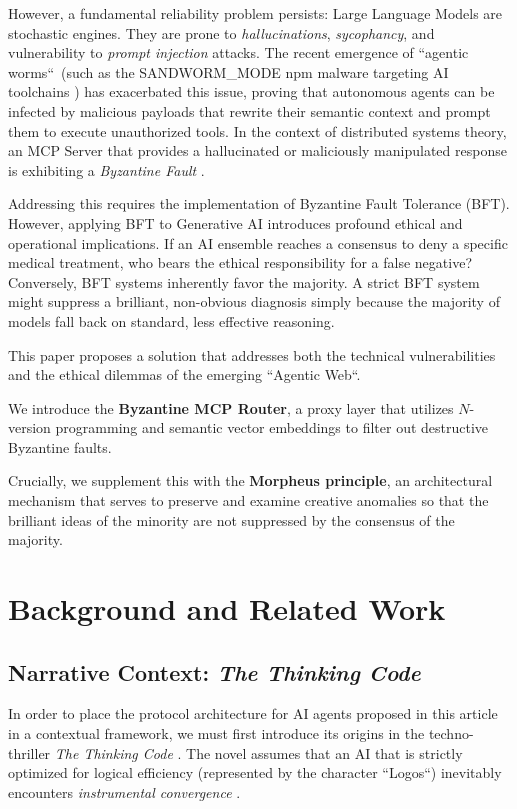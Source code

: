 \documentclass[a4paper,11pt,twocolumn]{article}
\theoremstyle{definition}
\theoremstyle{plain}
\begin{document}
However, a fundamental reliability problem persists: Large Language Models are stochastic engines. They are prone to \textit{hallucinations}, \textit{sycophancy}, and vulnerability to \textit{prompt injection} attacks. The recent emergence of “agentic worms“\ (such as the SANDWORM\_MODE npm malware targeting AI toolchains \cite{socket2026sandworm}) has exacerbated this issue, proving that autonomous agents can be infected by malicious payloads that rewrite their semantic context and prompt them to execute unauthorized tools. In the context of distributed systems theory, an MCP Server that provides a hallucinated or maliciously manipulated response is exhibiting a \textit{Byzantine Fault} \cite{lamport1982byzantine}.

Addressing this requires the implementation of Byzantine Fault Tolerance (BFT). However, applying BFT to Generative AI introduces profound ethical and operational implications. If an AI ensemble reaches a consensus to deny a specific medical treatment, who bears the ethical responsibility for a false negative? Conversely, BFT systems inherently favor the majority. A strict BFT system might suppress a brilliant, non-obvious diagnosis simply because the majority of models fall back on standard, less effective reasoning.

This paper proposes a solution that addresses both the technical vulnerabilities and the ethical dilemmas of the emerging “Agentic Web“.

\pagebreak

We introduce the \textbf{Byzantine MCP Router}, a proxy layer that utilizes $N$-version programming and semantic vector embeddings to filter out destructive Byzantine faults.

Crucially, we supplement this with the \textbf{Morpheus principle}, an architectural mechanism that serves to preserve and examine creative anomalies so that the brilliant ideas of the minority are not suppressed by the consensus of the majority.
\section{Background and Related Work}
\subsection{Narrative Context: \textit{The Thinking Code}}
In order to place the protocol architecture for AI agents proposed in this article in a contextual framework, we must first introduce its origins in the techno-thriller \textit{The Thinking Code} \cite{dulz2025code}. The novel assumes that an AI that is strictly optimized for logical efficiency (represented by the character “Logos“) inevitably encounters \textit{instrumental convergence} \cite{bostrom2014superintelligence}. 
\end{document}
